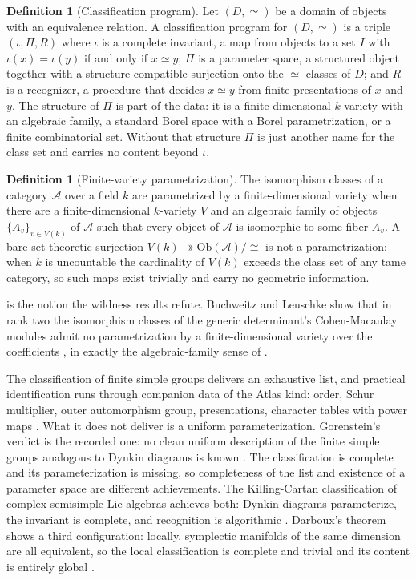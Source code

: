 \documentclass[11pt,letterpaper]{article}
\theoremstyle{definition}
\newtheorem{definition}[theorem]{Definition}
\theoremstyle{remark}
\begin{document}
\begin{definition}[Classification program]
\label{def:program}
Let $(D, \simeq)$ be a domain of objects with an equivalence relation. A classification program for $(D, \simeq)$ is a triple $(\iota, \Pi, R)$ where $\iota$ is a complete invariant, a map from objects to a set $I$ with $\iota(x) = \iota(y)$ if and only if $x \simeq y$; $\Pi$ is a parameter space, a structured object together with a structure-compatible surjection onto the $\simeq$-classes of $D$; and $R$ is a recognizer, a procedure that decides $x \simeq y$ from finite presentations of $x$ and $y$. The structure of $\Pi$ is part of the data: it is a finite-dimensional $k$-variety with an algebraic family, a standard Borel space with a Borel parametrization, or a finite combinatorial set. Without that structure $\Pi$ is just another name for the class set and carries no content beyond $\iota$.
\end{definition}

\begin{definition}[Finite-variety parametrization]
\label{def:param}
The isomorphism classes of a category $\mathcal{A}$ over a field $k$ are parametrized by a finite-dimensional variety when there are a finite-dimensional $k$-variety $V$ and an algebraic family of objects $\{A_v\}_{v \in V(k)}$ of $\mathcal{A}$ such that every object of $\mathcal{A}$ is isomorphic to some fiber $A_v$. A bare set-theoretic surjection $V(k) \twoheadrightarrow \mathrm{Ob}(\mathcal{A})/{\cong}$ is not a parametrization: when $k$ is uncountable the cardinality of $V(k)$ exceeds the class set of any tame category, so such maps exist trivially and carry no geometric information.
\end{definition}

 is the notion the wildness results refute. Buchweitz and Leuschke show that in rank two the isomorphism classes of the generic determinant's Cohen-Macaulay modules admit no parametrization by a finite-dimensional variety over the coefficients \cite{buchweitz2005}, in exactly the algebraic-family sense of .

The classification of finite simple groups delivers an exhaustive list, and practical identification runs through companion data of the Atlas kind: order, Schur multiplier, outer automorphism group, presentations, character tables with power maps \cite{atlaswiki}. What it does not deliver is a uniform parameterization. Gorenstein's verdict is the recorded one: no clean uniform description of the finite simple groups analogous to Dynkin diagrams is known \cite{solomon2001}. The classification is complete and its parameterization is missing, so completeness of the list and existence of a parameter space are different achievements. The Killing-Cartan classification of complex semisimple Lie algebras achieves both: Dynkin diagrams parameterize, the invariant is complete, and recognition is algorithmic \cite{humphreys,fultonharris}. Darboux's theorem shows a third configuration: locally, symplectic manifolds of the same dimension are all equivalent, so the local classification is complete and trivial and its content is entirely global \cite{darboux}.
\end{document}
